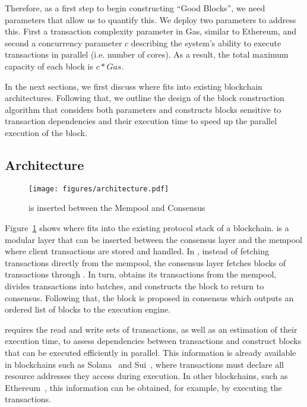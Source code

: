 
Therefore, as a first step to begin constructing ``Good Blocks'', we need parameters that allow us to quantify this. We deploy two parameters to address this. First a transaction complexity parameter in Gas, similar to Ethereum, and second a concurrency parameter $c$ describing the system's ability to execute transactions in parallel (i.e. number of cores). As a result, the total maximum capacity of each block is $c * Gas$.

In the next sections, we first discuss where \sys fits into existing blockchain architectures. Following that, we outline the design of the block construction algorithm that considers both parameters and constructs blocks sensitive to transaction dependencies and their execution time to speed up the parallel execution of the block.

\subsection{Architecture}

\begin{figure}
\begin{center}
	\texttt{[image: figures/architecture.pdf]}
\end{center}
\caption{\sys is inserted between the Mempool and Consensus}
\label{fig:architecture}
\end{figure}

Figure~\ref{fig:architecture} shows where \sys fits into the existing protocol stack of a blockchain. \sys is a modular layer that can be inserted between the consensus layer and the mempool where client transactions are stored and handled. 
In \sys, instead of fetching transactions directly from the mempool, the consensus layer fetches blocks of transactions through \sys. In turn, \sys obtains its transactions from the mempool, divides transactions into batches, and constructs the block to return to consensus.
Following that, the block is proposed in consensus which outputs an ordered list of blocks to the execution engine.

\sys requires the read and write sets of transactions, as well as an estimation of their execution time, to assess dependencies between transactions and construct blocks that can be executed efficiently in parallel. This information is already available in blockchains such as Solana~\cite{solana} and Sui~\cite{sui}, where transactions must declare all resource addresses they access during execution. In other blockchains, such as Ethereum~\cite{ethereum}, this information can be obtained, for example, by executing the transactions.

